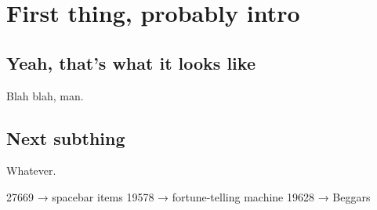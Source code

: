 \section{First thing, probably intro}
\subsection{Yeah, that's what it looks like}
Blah blah, man.
\subsection{Next subthing}
Whatever.

27669 → spacebar items 
19578 → fortune-telling machine
19628 → Beggars
